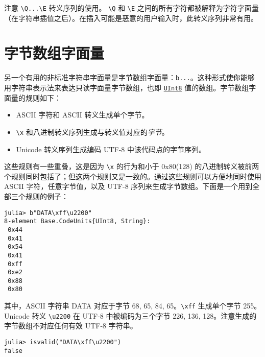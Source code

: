 注意 \texttt{{\textbackslash}Q...{\textbackslash}E} 转义序列的使用。 \texttt{{\textbackslash}Q} 和 \texttt{{\textbackslash}E} 之间的所有字符都被解释为字符字面量（在字符串插值之后）。在插入可能是恶意的用户输入时，此转义序列非常有用。



\hypertarget{14271532611053373881}{}


\section{字节数组字面量}



另一个有用的非标准字符串字面量是字节数组字面量：\texttt{b{\textquotedbl}...{\textquotedbl}}。这种形式使你能够用字符串表示法来表达只读字面量字节数组，也即 \hyperlink{6609065134969660118}{\texttt{UInt8}} 值的数组。字节数组字面量的规则如下：



\begin{itemize}
\item ASCII 字符和 ASCII 转义生成单个字节。


\item \texttt{{\textbackslash}x} 和八进制转义序列生成与转义值对应的\emph{字节}。


\item Unicode 转义序列生成编码 UTF-8 中该代码点的字节序列。

\end{itemize}


这些规则有一些重叠，这是因为 \texttt{{\textbackslash}x} 的行为和小于 0x80(128) 的八进制转义被前两个规则同时包括了；但这两个规则又是一致的。通过这些规则可以方便地同时使用 ASCII 字符，任意字节值，以及 UTF-8 序列来生成字节数组。下面是一个用到全部三个规则的例子：




\begin{verbatim}
julia> b"DATA\xff\u2200"
8-element Base.CodeUnits{UInt8, String}:
 0x44
 0x41
 0x54
 0x41
 0xff
 0xe2
 0x88
 0x80
\end{verbatim}



其中，ASCII 字符串 {\textquotedbl}DATA{\textquotedbl} 对应于字节 68, 65, 84, 65。\texttt{{\textbackslash}xff} 生成单个字节 255。Unicode 转义 \texttt{{\textbackslash}u2200} 在 UTF-8 中被编码为三个字节 226, 136, 128。注意生成的字节数组不对应任何有效 UTF-8 字符串。




\begin{verbatim}
julia> isvalid("DATA\xff\u2200")
false
\end{verbatim}



